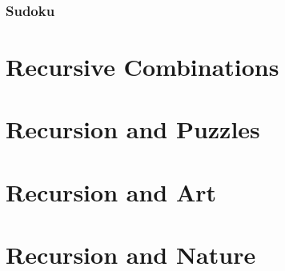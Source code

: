 \subsubsection{Sudoku}




\section{Recursive Combinations}



\section{Recursion and Puzzles}



\section{Recursion and Art}

\section{Recursion and Nature}
